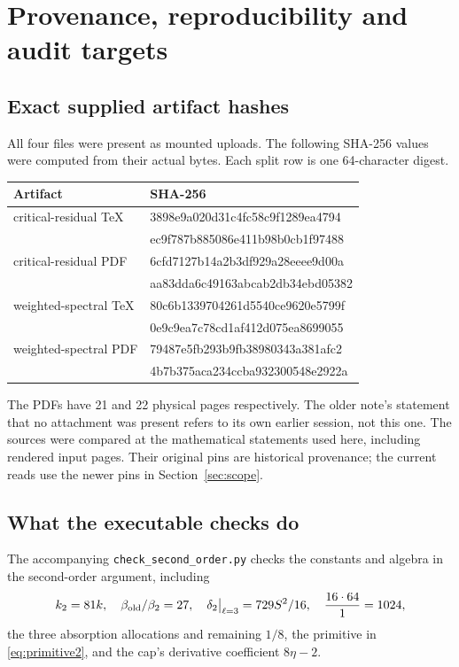 \documentclass[11pt,a4paper]{article}
\theoremstyle{definition}\newtheorem{definition}[theorem]{Definition}
\theoremstyle{remark}\newtheorem{remark}[theorem]{Remark}
\numberwithin{equation}{section}
\begin{document}
\section{Provenance, reproducibility and audit targets}
\label{app:checks}
\subsection{Exact supplied artifact hashes}
All four files were present as mounted uploads. The following SHA-256 values were computed from their actual bytes. Each split row is one 64-character digest.
\begin{center}\footnotesize\ttfamily
\begin{tabular}{@{}ll@{}}\toprule
\normalfont Artifact & \normalfont SHA-256\\\midrule
critical-residual TeX & 3898e9a020d31c4fc58c9f1289ea4794\\[-2pt]
 & ec9f787b885086e411b98b0cb1f97488\\[3pt]
critical-residual PDF & 6cfd7127b14a2b3df929a28eeee9d00a\\[-2pt]
 & aa83dda6c49163abcab2db34ebd05382\\[3pt]
weighted-spectral TeX & 80c6b1339704261d5540ce9620e5799f\\[-2pt]
 & 0e9c9ea7c78cd1af412d075ea8699055\\[3pt]
weighted-spectral PDF & 79487e5fb293b9fb38980343a381afc2\\[-2pt]
 & 4b7b375aca234ccba932300548e2922a\\\bottomrule
\end{tabular}
\end{center}
The PDFs have 21 and 22 physical pages respectively. The older note's statement that no attachment was present refers to its own earlier session, not this one. The sources were compared at the mathematical statements used here, including rendered input pages. Their original pins are historical provenance; the current reads use the newer pins in Section~\ref{sec:scope}.

\subsection{What the executable checks do}
The accompanying \texttt{check\_second\_order.py} checks the constants and algebra in the second-order argument, including
\[
 k_2=81k,\quad\beta_{\rm old}/\beta_2=27,\quad
 \delta_2\big|_{\ell=3}=729S^2/16,\quad
 \frac{16\cdot64}{1}=1024,
\]
the three absorption allocations and remaining $1/8$, the primitive in \eqref{eq:primitive2}, and the cap's derivative coefficient $8\eta-2$.
\end{document}
